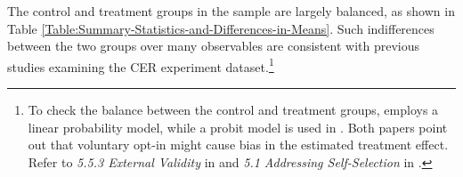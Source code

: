 The control and treatment groups in the sample are largely balanced, as shown in Table \ref{Table:Summary-Statistics-and-Differences-in-Means}. Such indifferences between the two groups over many observables are consistent with previous studies examining the CER experiment dataset.\footnote{To check the balance between the control and treatment groups, \cite{Peaking-Interest:How-Awareness-Drives-the-Effectiveness-of-Time-of-Use-Electricity-Pricing_Prest_2020} employs a linear probability model, while a probit model is used in \cite{The-Effect-of-Information-on-TOU-Electricity-Use:An-Irish-Residential-Study_Pon_2017}. Both papers point out that voluntary opt-in might cause bias in the estimated treatment effect. Refer to \textit{5.5.3 External Validity} in \cite{Peaking-Interest:How-Awareness-Drives-the-Effectiveness-of-Time-of-Use-Electricity-Pricing_Prest_2020} and \textit{5.1 Addressing Self-Selection} in \cite{The-Effect-of-Information-on-TOU-Electricity-Use:An-Irish-Residential-Study_Pon_2017}.}
